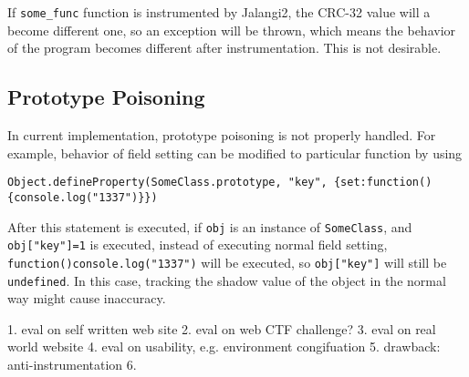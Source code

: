 If \texttt{some_func} function is instrumented by Jalangi2, the CRC-32 value will a become different one, so an exception will be thrown, which means the behavior of the program becomes different after instrumentation. This is not desirable.

\subsection{Prototype Poisoning}

In current implementation, prototype poisoning is not properly handled. For example, behavior of field setting can be modified to particular function by using 

\begin{verbatim}
Object.defineProperty(SomeClass.prototype, "key", {set:function(){console.log("1337")}})
\end{verbatim}

After this statement is executed, if \texttt{obj} is an instance of \texttt{SomeClass}, and \texttt{obj["key"]=1} is executed, instead of executing normal field setting, \texttt{function(){console.log("1337")}} will be executed, so \texttt{obj["key"]} will still be \texttt{undefined}. In this case, tracking the shadow value of the object in the normal way might cause inaccuracy.



1. eval on self written web site
2. eval on web CTF challenge?
3. eval on real world website
4. eval on usability, e.g. environment congifuation
5. drawback: anti-instrumentation
6. 


